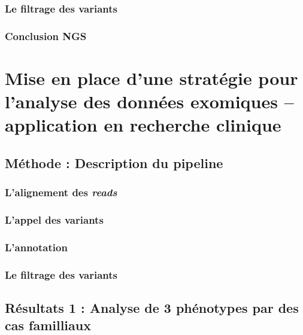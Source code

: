 \documentclass[12pt,twoside]{ugathesis}
\begin{document}
\subsection{Le filtrage des variants}\label{le-filtrage-des-variants}

\subsection{Conclusion NGS}\label{conclusion-ngs}

\chapter{Mise en place d'une stratégie pour l'analyse des données
exomiques -- application en recherche
clinique}\label{mise-en-place-dune-strategie-pour-lanalyse-des-donnees-exomiques-application-en-recherche-clinique}

\section{Méthode : Description du
pipeline}\label{methode-description-du-pipeline}

\subsection{\texorpdfstring{L'alignement des
\emph{reads}}{L'alignement des reads}}\label{lalignement-des-reads}

\subsection{L'appel des variants}\label{lappel-des-variants}

\subsection{L'annotation}\label{lannotation}

\subsection{Le filtrage des variants}\label{le-filtrage-des-variants-1}

\section{Résultats 1 : Analyse de 3 phénotypes par des cas
familliaux}\label{resultats-1-analyse-de-3-phenotypes-par-des-cas-familliaux}
\end{document}
